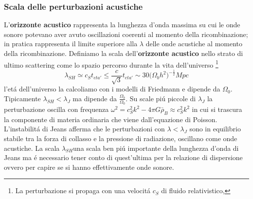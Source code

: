 \documentclass[12pt, a4paper]{article}
\begin{document}
\subsubsection{Scala delle perturbazioni acustiche }
L’\textbf{orizzonte acustico} rappresenta la lunghezza d’onda massima su cui le onde sonore potevano aver avuto oscillazioni coerenti al momento della ricombinazione; in pratica rappresenta il limite superiore alla $\lambda$ delle onde acustiche al momento della ricombinazione.
Definiamo la scala dell'\textbf{orizzonte acustico} nello strato di ultimo scattering come lo spazio percorso durante la vita dell'universo \footnote{La perturbazione si propaga con una velocit\'{a} $c_S$ di fluido relativistico, }
\begin{equation}
\lambda_{SH}\simeq c_S t_{eta'} \leq \frac{c}{\sqrt{3}}t_{eta'}\sim 30 \biggl(\Omega_b h^2\biggr)^{-\frac{1}{2}} Mpc
\end{equation}
l'et\'{a} dell'universo la calcoliamo con i modelli di Friedmann e dipende da $\Omega_0$. Tipicamente $\lambda_{SH}<\lambda_J$ ma dipende da $\frac{\Omega_b}{\Omega_0}$. Su scale pi\'{u} piccole di $\lambda_J$ la perturbazione oscilla con frequenza $\omega^2= c_S^2k^2-4\pi G\bar{\rho}_B\approx c_S^2k^2$ in cui si trascura la componente di materia ordinaria che viene dall'equazione di Poisson. L'instabilit\'{a} di Jeans afferma che le perturbazioni con $\lambda<\lambda_J$ sono in equilibrio stabile tra la forza di collasso e la pressione di radiazione, oscillano come onde acustiche. La scala $\lambda_{SH}$una scala ben pi\'{u} importante della lunghezza d’onda di Jeans ma \'{e} necessario tener conto di quest’ultima per la relazione di dispersione ovvero per capire se si hanno effettivamente onde sonore.\\
\end{document}
